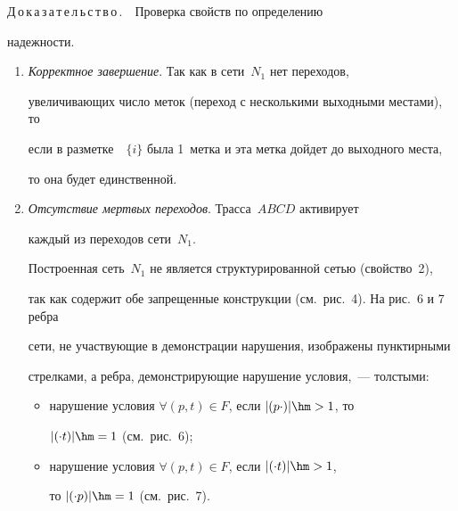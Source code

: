   \smallskip

  

  \noindent

  Д\,о\,к\,а\,з\,а\,т\,е\,л\,ь\,с\,т\,в\,о\,.\ \ Проверка свойств по определению 

надежности.

  \begin{enumerate}

\item \textit{Корректное завершение}. Так как в сети~$N_1$ нет переходов, 

увеличивающих число меток (переход с несколькими выходными местами), то 

если в разметке~~$\{i\}$ была 1~метка и эта метка дойдет до выходного места, 

то она будет единственной.

\item \textit{Отсутствие мертвых переходов}. Трасса~$ABCD$  активирует 

каждый из переходов сети~$N_1$.

Построенная сеть~$N_1$ не является структурированной сетью (свойство~2), 

так как содержит обе запрещенные конструкции (см.\ рис.~4). На рис.~6 и 7 ребра 

сети, не участвующие в демонстрации нарушения, изображены пунктирными 

стрелками, а ребра, демонстрирующие нарушение условия,~--- толстыми:

\begin{itemize}

\item нарушение условия $\forall (p,t)\in F$, если $\vert (p\cdot)\vert \hm>1$, то 

$\vert (\cdot t)\vert \hm= 1$ (см.\ рис.~6);

\item нарушение условия $\forall (p,t)\in F$,  если $\vert (\cdot t)\vert \hm >1$, 

то $\vert (\cdot p)\vert \hm=1$ (см.\ рис.~7).

\end{itemize}

\end{enumerate}




